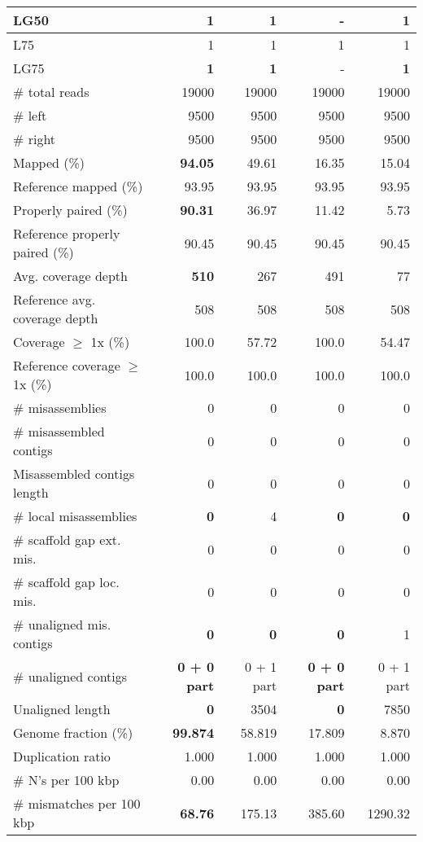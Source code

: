 \documentclass[12pt,a4paper]{article}
\begin{document}
\begin{table}[ht]
\begin{center}
\begin{tabular}{|l*{4}{|r}|}
LG50 & {\bf 1} & {\bf 1} & - & {\bf 1} \\ \hline
L75 & 1 & 1 & 1 & 1 \\ \hline
LG75 & {\bf 1} & {\bf 1} & - & {\bf 1} \\ \hline
\# total reads & 19000 & 19000 & 19000 & 19000 \\ \hline
\# left & 9500 & 9500 & 9500 & 9500 \\ \hline
\# right & 9500 & 9500 & 9500 & 9500 \\ \hline
Mapped (\%) & {\bf 94.05} & 49.61 & 16.35 & 15.04 \\ \hline
Reference mapped (\%) & 93.95 & 93.95 & 93.95 & 93.95 \\ \hline
Properly paired (\%) & {\bf 90.31} & 36.97 & 11.42 & 5.73 \\ \hline
Reference properly paired (\%) & 90.45 & 90.45 & 90.45 & 90.45 \\ \hline
Avg. coverage depth & {\bf 510} & 267 & 491 & 77 \\ \hline
Reference avg. coverage depth & 508 & 508 & 508 & 508 \\ \hline
Coverage $\geq$ 1x (\%) & 100.0 & 57.72 & 100.0 & 54.47 \\ \hline
Reference coverage $\geq$ 1x (\%) & 100.0 & 100.0 & 100.0 & 100.0 \\ \hline
\# misassemblies & 0 & 0 & 0 & 0 \\ \hline
\# misassembled contigs & 0 & 0 & 0 & 0 \\ \hline
Misassembled contigs length & 0 & 0 & 0 & 0 \\ \hline
\# local misassemblies & {\bf 0} & 4 & {\bf 0} & {\bf 0} \\ \hline
\# scaffold gap ext. mis. & 0 & 0 & 0 & 0 \\ \hline
\# scaffold gap loc. mis. & 0 & 0 & 0 & 0 \\ \hline
\# unaligned mis. contigs & {\bf 0} & {\bf 0} & {\bf 0} & 1 \\ \hline
\# unaligned contigs & {\bf 0 + 0 part} & 0 + 1 part & {\bf 0 + 0 part} & 0 + 1 part \\ \hline
Unaligned length & {\bf 0} & 3504 & {\bf 0} & 7850 \\ \hline
Genome fraction (\%) & {\bf 99.874} & 58.819 & 17.809 & 8.870 \\ \hline
Duplication ratio & 1.000 & 1.000 & 1.000 & 1.000 \\ \hline
\# N's per 100 kbp & 0.00 & 0.00 & 0.00 & 0.00 \\ \hline
\# mismatches per 100 kbp & {\bf 68.76} & 175.13 & 385.60 & 1290.32 \\ \hline

\end{tabular}
\end{center}
\end{table}
\end{document}
